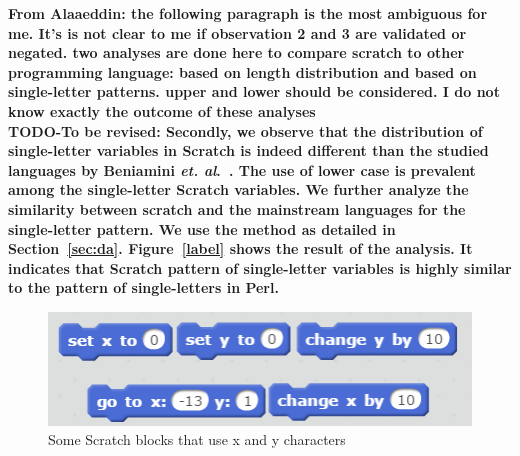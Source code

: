 \documentclass[conference]{IEEEtran}
\newcommand{\todo}[1]{ \textbf{#1} }
\begin{document}
\todo{From Alaaeddin: the following paragraph is the most ambiguous for me. It's is not clear to me if observation 2 and 3 are validated or negated. two analyses are done here to compare scratch to other programming language: based on length distribution and based on single-letter patterns. upper and lower should be considered. I do not know exactly the outcome of these analyses }
\\
\todo{TODO-To be revised: Secondly, we observe that the distribution of single-letter variables in Scratch is indeed different than the studied languages by Beniamini \textit{et. al}.~\cite{Beniamini}. The use of lower case is prevalent among the single-letter Scratch variables. We further analyze the similarity between scratch and the mainstream languages for the single-letter pattern. We use \todo{the method} as detailed in Section~\ref{sec:da}. Figure~\ref{label} shows the result of the analysis. It indicates that Scratch pattern of single-letter variables is highly similar to the pattern of single-letters in Perl.}

\begin{figure}[h]
	\begin{center}
		\includegraphics[width=\columnwidth]{fig/builtinblocks_xy}
		\caption{Some Scratch blocks that use x and y characters}
		\label{fig:xy_scratchblocks}
	\end{center}
\end{figure} 
\end{document}
